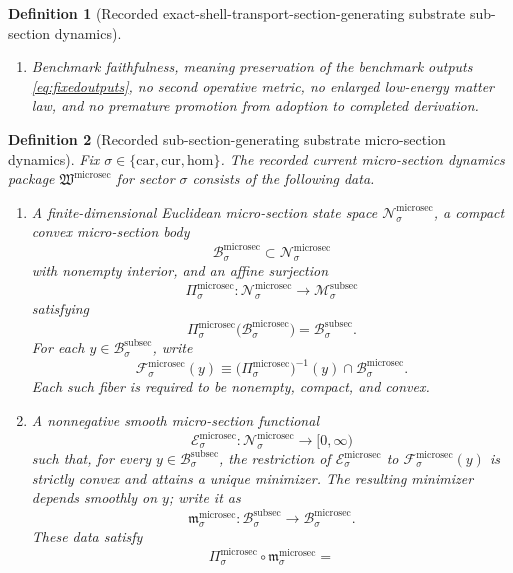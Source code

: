 \documentclass[11pt]{article}
\newcommand{\Car}{\mathrm{car}}
\newcommand{\Cur}{\mathrm{cur}}
\newcommand{\Hom}{\mathrm{hom}}
\newcommand{\PreCoreTrShell}[1]{\mathcal Z_{#1}^{\mathrm{precore,tr}}}
\newcommand{\SubSectionSpace}[1]{\mathcal M_{#1}^{\mathrm{subsec}}}
\newcommand{\SubSectionBody}[1]{\mathcal B_{#1}^{\mathrm{subsec}}}
\newcommand{\SubSectionProj}[1]{\Pi_{#1}^{\mathrm{subsec}}}
\newcommand{\SubSectionFiber}[2]{\mathcal F_{#1}^{\mathrm{subsec}}(#2)}
\newcommand{\SubSectionFunctional}[1]{\mathscr E_{#1}^{\mathrm{subsec}}}
\newcommand{\SubSectionShell}[1]{\mathcal Z_{#1}^{\mathrm{subsec}}}
\newcommand{\MicroSectionPackage}{\mathfrak W^{\mathrm{microsec}}}
\newcommand{\MicroSectionSpace}[1]{\mathcal N_{#1}^{\mathrm{microsec}}}
\newcommand{\MicroSectionBody}[1]{\mathcal B_{#1}^{\mathrm{microsec}}}
\newcommand{\MicroSectionProj}[1]{\Pi_{#1}^{\mathrm{microsec}}}
\newcommand{\MicroSectionFiber}[2]{\mathcal F_{#1}^{\mathrm{microsec}}(#2)}
\newcommand{\MicroSectionSubMin}[1]{\mathfrak m_{#1}^{\mathrm{microsec}}}
\newcommand{\MicroSectionFunctional}[1]{\mathscr E_{#1}^{\mathrm{microsec}}}
\newtheorem{definition}{Definition}
\begin{document}
\begin{definition}[Recorded exact-shell-transport-section-generating substrate sub-section dynamics]
\begin{enumerate}
\[    \;
    \SubSectionFunctional{\sigma}(y)
    =
    \min_{z\in\SubSectionFiber{\sigma}{\SubSectionProj{\sigma}(y)}}
    \SubSectionFunctional{\sigma}(z)
    \right\},
    \]
    and
    \[
    \SubSectionProj{\sigma}\big|_{\SubSectionShell{\sigma}}
    :
    \SubSectionShell{\sigma}
    \xrightarrow{\cong}
    \PreCoreTrShell{\sigma}
    \]
    is a diffeomorphism.
    \item Benchmark faithfulness, meaning preservation of the benchmark outputs \eqref{eq:fixedoutputs}, no second operative metric, no enlarged low-energy matter law, and no premature promotion from adoption to completed derivation.
\end{enumerate}
\end{definition}

\begin{definition}[Recorded sub-section-generating substrate micro-section dynamics]
\label{def:microsec}
Fix \(\sigma\in\{\Car,\Cur,\Hom\}\). The recorded current micro-section dynamics package \(\MicroSectionPackage\) for sector \(\sigma\) consists of the following data.
\begin{enumerate}
    \item A finite-dimensional Euclidean micro-section state space \(\MicroSectionSpace{\sigma}\), a compact convex micro-section body
    \[
    \MicroSectionBody{\sigma}\subset\MicroSectionSpace{\sigma}
    \]
    with nonempty interior, and an affine surjection
    \[
    \MicroSectionProj{\sigma}:\MicroSectionSpace{\sigma}\to\SubSectionSpace{\sigma}
    \]
    satisfying
    \[
    \MicroSectionProj{\sigma}\bigl(\MicroSectionBody{\sigma}\bigr)=\SubSectionBody{\sigma}.
    \]
    For each \(y\in\SubSectionBody{\sigma}\), write
    \[
    \MicroSectionFiber{\sigma}{y}
    \equiv
    \bigl(\MicroSectionProj{\sigma}\bigr)^{-1}(y)\cap\MicroSectionBody{\sigma}.
    \]
    Each such fiber is required to be nonempty, compact, and convex.
    \item A nonnegative smooth micro-section functional
    \[
    \MicroSectionFunctional{\sigma}:\MicroSectionSpace{\sigma}\to[0,\infty)
    \]
    such that, for every \(y\in\SubSectionBody{\sigma}\), the restriction of \(\MicroSectionFunctional{\sigma}\) to \(\MicroSectionFiber{\sigma}{y}\) is strictly convex and attains a unique minimizer. The resulting minimizer depends smoothly on \(y\); write it as
    \[
    \MicroSectionSubMin{\sigma}:\SubSectionBody{\sigma}\to\MicroSectionBody{\sigma}.
    \]
    These data satisfy
    \[
    \MicroSectionProj{\sigma}\circ\MicroSectionSubMin{\sigma}
    =
\]
\end{enumerate}
\end{definition}
\end{document}
